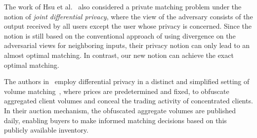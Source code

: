 The work of Hsu et al.~\cite{DBLP:journals/siamcomp/HsuHRRW16} also considered a private matching problem under the notion of \emph{joint differential privacy}, where the view of the adversary consists of the output received by all users except the user whose privacy is concerned.
Since the notion is still based on the conventional approach of using divergence on the adversarial views for neighboring inputs, their privacy notion can only lead to an almost optimal matching. In contrast, our new notion can achieve the exact optimal matching.


The authors in~\cite{PolychroniadouC24} employ differential privacy in a distinct and simplified setting of volume matching~\cite{BalchDP20,GamaCPSA22,polychroniadou2023prime}, where prices are predetermined and fixed, to obfuscate aggregated client volumes and conceal the trading activity of concentrated clients. In their auction mechanism, the obfuscated aggregate volumes are published daily, enabling buyers to make informed matching decisions based on this publicly available inventory. 